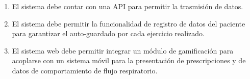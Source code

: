 \documentclass[12pt]{article}
\begin{document}
\begin{enumerate}[start=1,label={\bfseries RF0\arabic*.}]
\begin{enumerate}[label*=\arabic*.]
            \end{enumerate}
        

      
    
    
    \item El sistema debe contar con una API para permitir la trasmisión de datos.
    
   
    
    
   
    \item El sistema debe permitir la funcionalidad de registro de datos del paciente para garantizar el auto-guardado por cada ejercicio realizado.
    
    
  
    
    
    \item El sistema web debe permitir integrar un módulo de gamificación para acoplarse con un sistema móvil para la presentación de  prescripciones y  de datos de comportamiento de  flujo respiratorio.
    
     
    
            
    
        


\end{enumerate}
\end{document}
